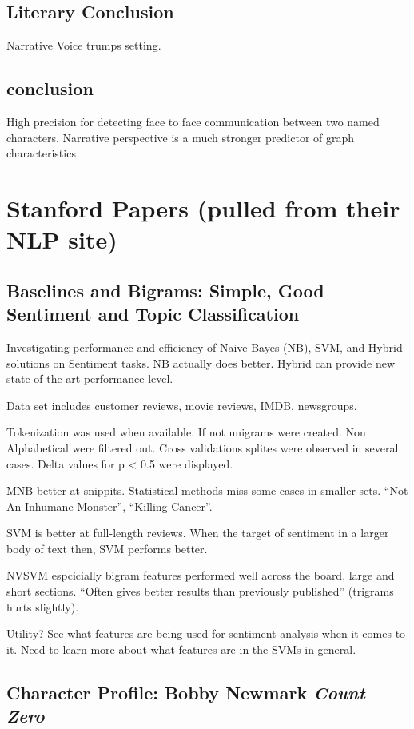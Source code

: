 \documentclass{report}\usepackage[]{graphicx}\usepackage[]{color}
\begin{document}
{\subsection{Literary Conclusion}

Narrative Voice trumps setting.

\subsection{conclusion}

High precision for detecting face to face communication between two
named characters. Narrative perspective is a much stronger predictor of
graph characteristics
\section{Stanford Papers (pulled from their NLP site)}

\subsection{Baselines and Bigrams: Simple, Good Sentiment and Topic Classification}
\date{January 30, 2014}

Investigating performance and efficiency of Naive Bayes (NB), SVM, and Hybrid solutions on Sentiment tasks. NB actually does better. Hybrid can provide new state of the art performance level.

Data set includes customer reviews, movie reviews, IMDB, newsgroups.

Tokenization was used when available. If not unigrams were created. Non Alphabetical were filtered out. Cross validations splites were observed in several cases. Delta values for p < 0.5 were displayed. 

MNB better at snippits. Statistical methods miss some cases in smaller sets. ``Not An Inhumane Monster'', ``Killing Cancer''.  

SVM is better at full-length reviews. When the target of sentiment in a larger body of text then, SVM performs better.

NVSVM espcicially bigram features performed well across the board, large and short sections. ``Often gives better results than previously published'' (trigrams hurts slightly). 

Utility? See what features are being used for sentiment analysis when it comes to it. Need to learn more about what features are in the SVMs in general.

\subsection{Character Profile: Bobby Newmark \textit{Count Zero}}
\date{February 2, 2014}

}
\end{document}
